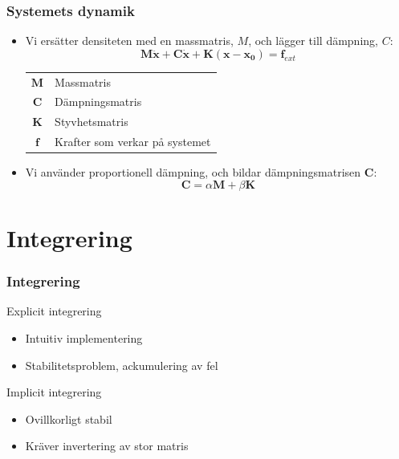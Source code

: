 \documentclass{beamer}
\begin{document}
\begin{frame}
\frametitle{Systemets dynamik}
\begin{itemize}
\item Vi ersätter densiteten med en massmatris, $M$, och lägger till dämpning, $C$:
	\begin{equation}
		\mathbf{M\ddot{x}} + \mathbf{C\dot{x}} + \mathbf{K(x - x_0)}  = \mathbf{f}_{ext}
	\end{equation}


\begin{center}
\begin{tabular}{c l}
$\mathbf{M}$ & Massmatris \\
$\mathbf{C}$ & Dämpningsmatris \\
$\mathbf{K}$ & Styvhetsmatris\\
$\mathbf{f}$ & Krafter som verkar på systemet \\
\end{tabular}
\end{center}
\item Vi använder proportionell dämpning, och bildar dämpningsmatrisen $\mathbf{C}$:
	\begin{equation}
		\mathbf{C} = \alpha \mathbf{M} + \beta \mathbf{K}
	\end{equation}

\end{itemize}
\end{frame}

\section{Integrering}
\begin{frame}
\frametitle{Integrering}
\begin{block}{Explicit integrering}
\begin{itemize}
\item Intuitiv implementering
\item Stabilitetsproblem, ackumulering av fel
\end{itemize}
\end{block}

\begin{block}{Implicit integrering}
\begin{itemize}
\item Ovillkorligt stabil
\item Kräver invertering av stor matris
\end{itemize}
\end{block}

\end{frame}
\end{document}
